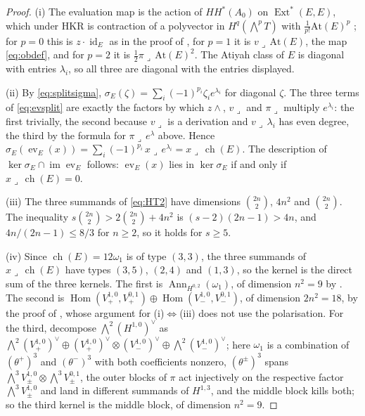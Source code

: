 \documentclass[11pt,reqno]{amsart}
\theoremstyle{plain}
\theoremstyle{definition}
\theoremstyle{remark}
\DeclareMathOperator{\ch}{ch}
\DeclareMathOperator{\Hom}{Hom}
\DeclareMathOperator{\Ext}{Ext}
\DeclareMathOperator{\image}{im}
\DeclareMathOperator{\id}{id}
\DeclareMathOperator{\Ann}{Ann}
\begin{document}
\begin{proof}
(i) The evaluation map is the action of $HH^{*}(A_{0})$ on
$\Ext^{*}(E,E)$, which under HKR is contraction of a polyvector in
$H^{q}(\bigwedge^{p}T)$ with $\tfrac{1}{p!}\mathrm{At}(E)^{p}$
\cite{BF08}; for $p=0$ this is $z\cdot\id_{E}$ as in the proof of
\cite[Theorem~9.19]{paperI}, for $p=1$ it is $v\lrcorner\,\mathrm{At}(E)$, the map
\eqref{eq:obdef}, and for $p=2$ it is $\tfrac12\pi\lrcorner\,\mathrm{At}(E)^{2}$.
The Atiyah class of $E$ is diagonal with entries $\lambda_{i}$, so all three
are diagonal with the entries displayed.

(ii) By \eqref{eq:splitsigma}, $\sigma_{E}(\zeta)=\sum_{i}(-1)^{p_{i}}\zeta_{i}
e^{\lambda_{i}}$ for diagonal $\zeta$. The three terms of \eqref{eq:evsplit}
are exactly the factors by which $z\wedge$, $v\lrcorner$ and $\pi\lrcorner$
multiply $e^{\lambda_{i}}$: the first trivially, the second because
$v\lrcorner$ is a derivation and $v\lrcorner\,\lambda_{i}$ has even degree,
the third by the formula for $\pi\lrcorner\,e^{\lambda}$ above. Hence
$\sigma_{E}(\operatorname{ev}_{E}(x))=\sum_{i}(-1)^{p_{i}}\,x\lrcorner\,
e^{\lambda_{i}}=x\lrcorner\,\ch(E)$. The description of
$\ker\sigma_{E}\cap\image\operatorname{ev}_{E}$ follows: $\operatorname{ev}_{E}(x)$
lies in $\ker\sigma_{E}$ if and only if $x\lrcorner\,\ch(E)=0$.

(iii) The three summands of \eqref{eq:HT2} have dimensions $\binom{2n}{2}$,
$4n^{2}$ and $\binom{2n}{2}$. The inequality
$s\binom{2n}{2}>2\binom{2n}{2}+4n^{2}$ is $(s-2)(2n-1)>4n$, and
$4n/(2n-1)\le8/3$ for $n\ge2$, so it holds for $s\ge5$.

(iv) Since $\ch(E)=12\omega_{1}$ is of type $(3,3)$, the three summands of
$x\lrcorner\,\ch(E)$ have types $(3,5)$, $(2,4)$ and $(1,3)$, so the kernel
is the direct sum of the three kernels. The first is $\Ann_{H^{0,2}}(\omega_{1})$,
of dimension $n^{2}=9$ by \cite[Lemma~9.6]{paperI}. The second is
$\Hom(V_{+}^{1,0},V_{+}^{0,1})\oplus\Hom(V_{-}^{1,0},V_{-}^{0,1})$, of
dimension $2n^{2}=18$, by the proof of \cite[Proposition~9.14]{paperI}, whose
argument for (i)$\Leftrightarrow$(iii) does not use the polarisation. For the
third, decompose $\bigwedge^{2}(H^{1,0})^{\vee}$ as
$\bigwedge^{2}(V_{+}^{1,0})^{\vee}\oplus(V_{+}^{1,0})^{\vee}\otimes(V_{-}^{1,0})^{\vee}
\oplus\bigwedge^{2}(V_{-}^{1,0})^{\vee}$; here $\omega_{1}$ is a combination
of $(\theta^{+})^{3}$ and $(\theta^{-})^{3}$ with both coefficients nonzero,
$(\theta^{\pm})^{3}$ spans $\bigwedge^{3}V_{\pm}^{1,0}\otimes\bigwedge^{3}V_{\pm}^{0,1}$,
the outer blocks of $\pi$ act injectively on the respective factor
$\bigwedge^{3}V_{\pm}^{1,0}$ and land in different summands of $H^{1,3}$,
and the middle block kills both; so the third kernel is the middle block,
of dimension $n^{2}=9$.


\end{proof}
\end{document}

